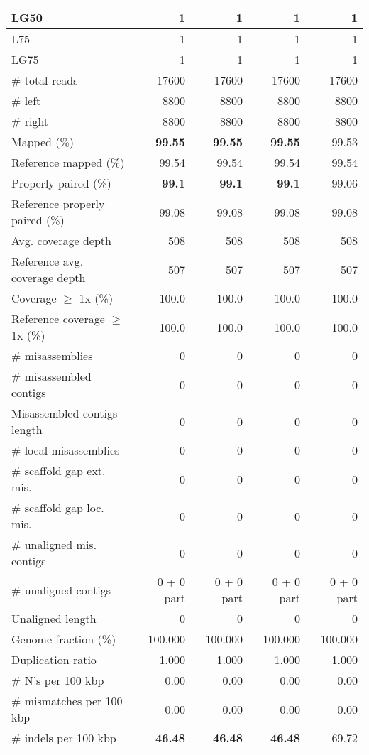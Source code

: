\documentclass[12pt,a4paper]{article}
\begin{document}
\begin{table}[ht]
\begin{center}
\begin{tabular}{|l*{4}{|r}|}
LG50 & 1 & 1 & 1 & 1 \\ \hline
L75 & 1 & 1 & 1 & 1 \\ \hline
LG75 & 1 & 1 & 1 & 1 \\ \hline
\# total reads & 17600 & 17600 & 17600 & 17600 \\ \hline
\# left & 8800 & 8800 & 8800 & 8800 \\ \hline
\# right & 8800 & 8800 & 8800 & 8800 \\ \hline
Mapped (\%) & {\bf 99.55} & {\bf 99.55} & {\bf 99.55} & 99.53 \\ \hline
Reference mapped (\%) & 99.54 & 99.54 & 99.54 & 99.54 \\ \hline
Properly paired (\%) & {\bf 99.1} & {\bf 99.1} & {\bf 99.1} & 99.06 \\ \hline
Reference properly paired (\%) & 99.08 & 99.08 & 99.08 & 99.08 \\ \hline
Avg. coverage depth & 508 & 508 & 508 & 508 \\ \hline
Reference avg. coverage depth & 507 & 507 & 507 & 507 \\ \hline
Coverage $\geq$ 1x (\%) & 100.0 & 100.0 & 100.0 & 100.0 \\ \hline
Reference coverage $\geq$ 1x (\%) & 100.0 & 100.0 & 100.0 & 100.0 \\ \hline
\# misassemblies & 0 & 0 & 0 & 0 \\ \hline
\# misassembled contigs & 0 & 0 & 0 & 0 \\ \hline
Misassembled contigs length & 0 & 0 & 0 & 0 \\ \hline
\# local misassemblies & 0 & 0 & 0 & 0 \\ \hline
\# scaffold gap ext. mis. & 0 & 0 & 0 & 0 \\ \hline
\# scaffold gap loc. mis. & 0 & 0 & 0 & 0 \\ \hline
\# unaligned mis. contigs & 0 & 0 & 0 & 0 \\ \hline
\# unaligned contigs & 0 + 0 part & 0 + 0 part & 0 + 0 part & 0 + 0 part \\ \hline
Unaligned length & 0 & 0 & 0 & 0 \\ \hline
Genome fraction (\%) & 100.000 & 100.000 & 100.000 & 100.000 \\ \hline
Duplication ratio & 1.000 & 1.000 & 1.000 & 1.000 \\ \hline
\# N's per 100 kbp & 0.00 & 0.00 & 0.00 & 0.00 \\ \hline
\# mismatches per 100 kbp & 0.00 & 0.00 & 0.00 & 0.00 \\ \hline
\# indels per 100 kbp & {\bf 46.48} & {\bf 46.48} & {\bf 46.48} & 69.72 \\ \hline

\end{tabular}
\end{center}
\end{table}
\end{document}

